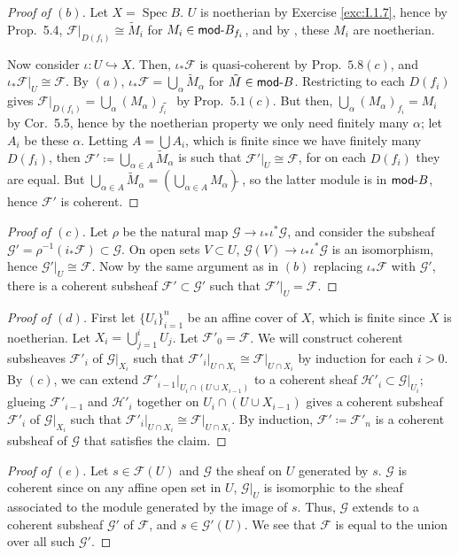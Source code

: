 \documentclass[10pt]{article}
\theoremstyle{definition}
\theoremstyle{remark}
\numberwithin{equation}{section}
\numberwithin{figure}{subsubsection}
\DeclareMathOperator{\Spec}{Spec}
\newcommand{\FF}{\mathscr{F}}
\newcommand{\GG}{\mathscr{G}}
\newcommand{\HH}{\mathscr{H}}
\newcommand{\Mod}{\mathsf{mod}\mathchar`-}
\begin{document}
\begin{proof}[Proof of $(b)$]
  Let $X = \Spec B$. $U$ is noetherian by Exercise \ref{exc:I.1.7}, hence by Prop.~5.4, $\FF\vert_{D(f_i)} \cong \tilde{M}_i$ for $M_i \in \Mod B_{f_i}$, and by \cite[Prop.~6.5]{AM69}, these $M_i$ are noetherian.
  \par Now consider $\iota\colon U \hookrightarrow X$. Then, $\iota_*\FF$ is quasi-coherent by Prop.~$5.8(c)$, and $\iota_*\FF\vert_U \cong \FF$. By $(a)$, $\iota_*\FF = \bigcup_\alpha \tilde{M}_\alpha$ for $\tilde{M} \in \Mod B$. Restricting to each $D(f_i)$ gives $\FF\vert_{D(f_i)} = \bigcup_\alpha (M_\alpha)_{f_i}\!\!\tilde{}\:\:$ by Prop.~$5.1(c)$. But then, $\bigcup_\alpha (M_\alpha)_{f_i} = M_i$ by Cor.~5.5, hence by the noetherian property we only need finitely many $\alpha$; let $A_i$ be these $\alpha$. Letting $A = \bigcup A_i$, which is finite since we have finitely many $D(f_i)$, then $\FF' \coloneqq \bigcup_{\alpha \in A} \tilde{M}_\alpha$ is such that $\FF'\vert_U \cong \FF$, for on each $D(f_i)$ they are equal. But $\bigcup_{\alpha \in A} \tilde{M}_\alpha = \left(\bigcup_{\alpha \in A} M_\alpha\right)\tilde{}\:$, so the latter module is in $\Mod B$, hence $\FF'$ is coherent.
\end{proof}
\begin{proof}[Proof of $(c)$]
  Let $\rho$ be the natural map $\GG \to \iota_*\iota^*\GG$, and consider the subsheaf $\GG' = \rho^{-1}(i_*\FF) \subset \GG$. On open sets $V \subset U$, $\GG(V) \to \iota_*\iota^*\GG$ is an isomorphism, hence $\GG'\vert_U \cong \FF$. Now by the same argument as in $(b)$ replacing $\iota_*\FF$ with $\GG'$, there is a coherent subsheaf $\FF' \subset \GG'$ such that $\FF'\vert_U = \FF$.
\end{proof}
\begin{proof}[Proof of $(d)$]
  First let $\{U_i\}_{i=1}^n$ be an affine cover of $X$, which is finite since $X$ is noetherian. Let $X_i = \bigcup_{j=1}^i U_j$. Let $\FF'_0 = \FF$. We will construct coherent subsheaves $\FF'_i$ of $\GG\vert_{X_i}$ such that $\FF'_i\vert_{U \cap X_i} \cong \FF\vert_{U \cap X_i}$ by induction for each $i > 0$. By $(c)$, we can extend $\FF'_{i-1}\vert_{U_i \cap (U \cup X_{i-1})}$ to a coherent sheaf $\HH'_i \subset \GG\vert_{U_i}$; glueing $\FF'_{i-1}$ and $\HH'_i$ together on $U_i \cap (U \cup X_{i-1})$ gives a coherent subsheaf $\FF'_i$ of $\GG\vert_{X_i}$ such that $\FF'_i\vert_{U \cap X_i} \cong \FF\vert_{U \cap X_i}$. By induction, $\FF' \coloneqq \FF'_n$ is a coherent subsheaf of $\GG$ that satisfies the claim.
\end{proof}
\begin{proof}[Proof of $(e)$]
  Let $s \in \FF(U)$ and $\GG$ the sheaf on $U$ generated by $s$. $\GG$ is coherent since on any affine open set in $U$, $\GG\vert_U$ is isomorphic to the sheaf associated to the module generated by the image of $s$. Thus, $\GG$ extends to a coherent subsheaf $\GG'$ of $\FF$, and $s \in \GG'(U)$. We see that $\FF$ is equal to the union over all such $\GG'$.
\end{proof}
\end{document}
